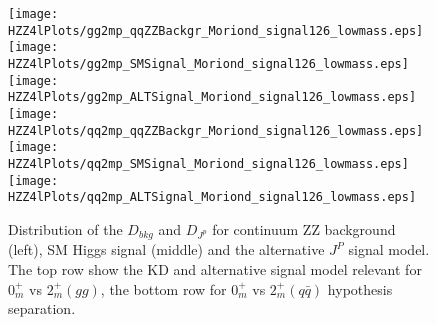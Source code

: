 \begin{figure}
\begin{center}
\texttt{[image: HZZ4lPlots/gg2mp\_qqZZBackgr\_Moriond\_signal126\_lowmass.eps]}
\texttt{[image: HZZ4lPlots/gg2mp\_SMSignal\_Moriond\_signal126\_lowmass.eps]}
\texttt{[image: HZZ4lPlots/gg2mp\_ALTSignal\_Moriond\_signal126\_lowmass.eps]}
\texttt{[image: HZZ4lPlots/qq2mp\_qqZZBackgr\_Moriond\_signal126\_lowmass.eps]}
\texttt{[image: HZZ4lPlots/qq2mp\_SMSignal\_Moriond\_signal126\_lowmass.eps]}
\texttt{[image: HZZ4lPlots/qq2mp\_ALTSignal\_Moriond\_signal126\_lowmass.eps]}
\label{fig:HZZ4lspin2KDvSKD}
\caption{Distribution of the $D_{bkg}$ and $D_{J^p}$ for continuum
ZZ background (left), SM Higgs signal (middle) and the 
alternative $J^P$ signal model.  The top row show the KD and 
alternative signal model relevant for $0_m^+$ vs $2_m^+(gg)$, the 
bottom row for $0_m^+$ vs $2_m^+(q\bar{q})$ hypothesis separation.}
\end{center}
\end{figure}
